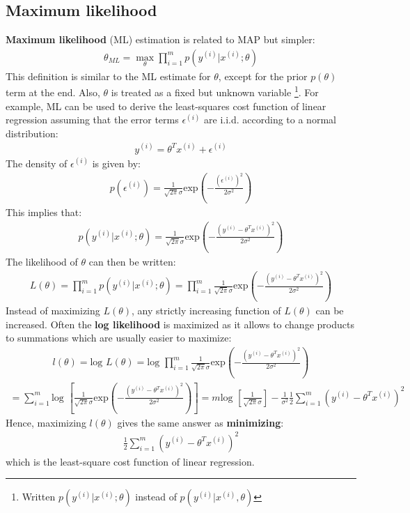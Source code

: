 \documentclass{report}
\begin{document}
\subsection{Maximum likelihood}
{\bf Maximum likelihood} (ML) estimation is related to MAP but simpler:
\begin{align*}
\theta_{ML}=\max\limits_{\theta} \prod_{i=1}^m p(y^{(i)}\vert x^{(i)};\theta)
\end{align*}
This definition is similar to the ML estimate for $\theta$, except for the prior $p(\theta)$ term at the end. 
Also, $\theta$ is treated as a fixed but unknown variable \footnote{Written $ p(y^{(i)}\vert x^{(i)};\theta)$ instead of $ p(y^{(i)}\vert x^{(i)},\theta)$}. For example, ML can be used to derive the least-squares cost function of linear regression assuming that the error terms $\epsilon^{(i)}$ are i.i.d. according to a normal distribution:
\begin{align*}
y^{(i)}=\theta^Tx^{(i)}+\epsilon^{(i)}
\end{align*}
The density of $\epsilon^{(i)}$ is given by:
\begin{align*}
p(\epsilon^{(i)})=\frac{1}{\sqrt{2\pi}\sigma}\mbox{exp}(-\frac{(\epsilon^{(i)})^2}{2\sigma^2})
\end{align*}
This implies that:
\begin{align*}
p(y^{(i)}\vert x^{(i)};\theta)=\frac{1}{\sqrt{2\pi}\sigma}\mbox{exp}(-\frac{(y^{(i)}-\theta^Tx^{(i)})^2}{2\sigma^2})
\end{align*}
The likelihood of $\theta$ can then be written:
\begin{align*}
L(\theta)=\prod_{i=1}^m p(y^{(i)}\vert x^{(i)};\theta)=\prod_{i=1}^m\frac{1}{\sqrt{2\pi}\sigma}\mbox{exp}(-\frac{(y^{(i)}-\theta^Tx^{(i)})^2}{2\sigma^2})
\end{align*}
Instead of maximizing $L(\theta)$, any strictly increasing function of $L(\theta)$ can be increased. Often the {\bf log likelihood} is maximized as it allows to change products to summations which are usually easier to maximize:
\begin{align*}
l(\theta)=\mbox{log } L(\theta)=\mbox{log }\prod_{i=1}^m\frac{1}{\sqrt{2\pi}\sigma}\mbox{exp}(-\frac{(y^{(i)}-\theta^Tx^{(i)})^2}{2\sigma^2})
\end{align*}
\begin{align*}
=\sum_{i=1}^m \mbox{log }[\frac{1}{\sqrt{2\pi}\sigma}\mbox{exp}(-\frac{(y^{(i)}-\theta^Tx^{(i)})^2}{2\sigma^2})]=m\mbox{log }[\frac{1}{\sqrt{2\pi}\sigma}] -\frac{1}{\sigma^2}\frac{1}{2}\sum_{i=1}^{m}(y^{(i)}-\theta^Tx^{(i)})^2
\end{align*}
Hence, maximizing $l(\theta)$ gives the same answer as {\bf minimizing}:
\begin{align*}
\frac{1}{2}\sum_{i=1}^{m}(y^{(i)}-\theta^Tx^{(i)})^2
\end{align*}
which is the least-square cost function of linear regression.
\end{document}
